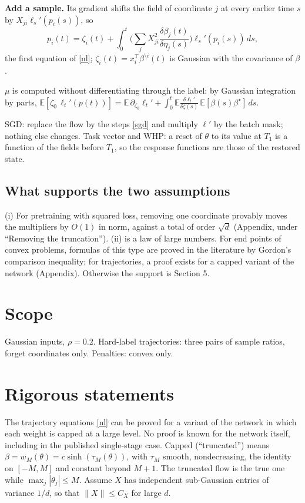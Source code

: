 \documentclass[10pt]{article}
\newcommand{\bs}{\beta^\star}\newcommand{\E}{\mathbb E}\newcommand{\asinh}{\operatorname{arcsinh}}\newcommand{\prox}{\operatorname{prox}}
\begin{document}
\textbf{Add a sample.} Its gradient shifts the field of coordinate $j$ at every earlier time $s$ by $X_{ji}\ell_s'(p_i(s))$, so
\[
p_i(t)=\zeta_i(t)+\int_0^t\Big(\sum_jX_{ji}^2\frac{\delta\beta_j(t)}{\delta\eta_j(s)}\Big)\ell_s'(p_i(s))\,ds ,
\]
the first equation of \eqref{nl}; $\zeta_i(t)=x_i^\top\beta^{\setminus i}(t)$ is Gaussian with the covariance of $\beta$.

$\mu$ is computed without differentiating through the label: by Gaussian integration by parts, $\E[\zeta_0\,\ell_t'(p(t))]=\E\,\partial_{\zeta_0}\ell_t'+\int_0^t\E\frac{\delta\ell_t'}{\delta\zeta(s)}\,\E[\beta(s)\bs]\,ds$.

SGD: replace the flow by the steps \eqref{sgd} and multiply $\ell'$ by the batch mask; nothing else changes. Task vector and WHP: a reset of $\theta$ to its value at $T_1$ is a function of the fields before $T_1$, so the response functions are those of the restored state.

\subsection{What supports the two assumptions}
(i) For pretraining with squared loss, removing one coordinate provably moves the multipliers by $O(1)$ in norm, against a total of order $\sqrt d$ (Appendix, under ``Removing the truncation''). (ii) is a law of large numbers. For end points of convex problems, formulas of this type are proved in the literature by Gordon's comparison inequality; for trajectories, a proof exists for a capped variant of the network (Appendix). Otherwise the support is Section 5.

\section*{Scope}
Gaussian inputs, $\rho=0.2$. Hard-label trajectories: three pairs of sample ratios, forget coordinates only. Penalties: convex only.

\normalsize
\appendix
\section{Rigorous statements}
The trajectory equations \eqref{nl} can be proved for a variant of the network in which each weight is capped at a large level. No proof is known for the network itself, including in the published single-stage case. Capped (``truncated'') means $\beta=w_M(\theta)=c\sinh(\tau_M(\theta))$, with $\tau_M$ smooth, nondecreasing, the identity on $[-M,M]$ and constant beyond $M+1$. The truncated flow is the true one while $\max_j|\theta_j|\le M$. Assume $X$ has independent sub-Gaussian entries of variance $1/d$, so that $\|X\|\le C_X$ for large $d$.
\end{document}
